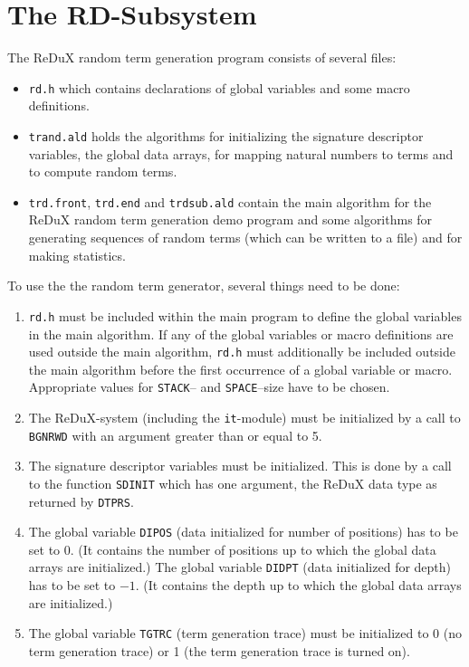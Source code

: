 \section{The RD-Subsystem}
\label{se:rd}

The ReDuX random term generation program consists of several files:
\begin{itemize}
\item {\tt rd.h} which contains declarations of global
   variables and some macro definitions.
\item {\tt trand.ald} holds the algorithms for initializing
   the signature descriptor variables, the global data arrays, for
   mapping natural numbers to terms and to compute random terms.
\item {\tt trd.front}, {\tt trd.end} and {\tt trdsub.ald} contain the main
   algorithm for the ReDuX random term generation demo program and some
   algorithms for generating sequences of random terms (which can be
   written to a file) and for making statistics.
\end{itemize}

To use the the random term generator, several things need to be done:
\begin{enumerate}
\item {\tt rd.h} must be included within the main program to
   define the global variables in the main algorithm. If any of the
   global variables or macro definitions are used outside the main
   algorithm, {\tt rd.h} must additionally be included outside
   the main algorithm before the first occurrence of a global variable
   or macro. Appropriate values for {\tt STACK}-- and {\tt SPACE}--size
   have to be chosen.
\item The ReDuX-system (including the {\tt it}-module) must be
   initialized by a call to {\tt BGNRWD} with an argument greater than
   or equal to 5.
\item The signature descriptor variables must be initialized. This is
   done by a call to the function {\tt SDINIT} which has one argument,
   the ReDuX data type as returned by {\tt DTPRS}.
\item The global variable {\tt DIPOS} (data initialized for number of
   positions) has to be set to $0$.  (It contains the number of
   positions up to which the global data arrays are initialized.) The
   global variable {\tt DIDPT} (data initialized for depth) has to be
   set to $-1$. (It contains the depth up to which the global data arrays
   are initialized.)
\item The global variable {\tt TGTRC} (term generation trace) must be
   initialized to 0 (no term generation trace) or 1 (the term
   generation trace is turned on).
\end{enumerate}

